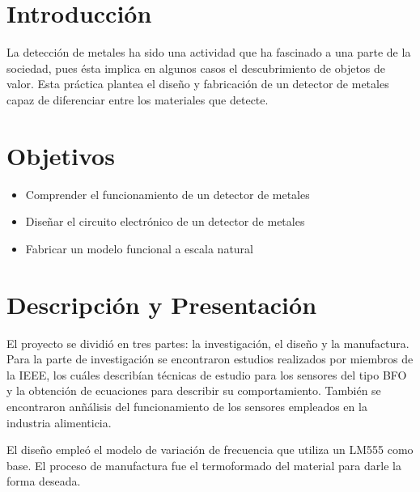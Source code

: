\section{Introducci\'on}
La detecci\'on de metales ha sido una actividad que ha fascinado a una parte de la 
sociedad, pues \'esta implica en  algunos casos el descubrimiento de objetos de 
valor. Esta pr\'actica plantea el dise\~no y fabricaci\'on de un detector de metales
capaz de diferenciar entre los materiales que detecte.
\section{Objetivos}
\begin{itemize}
 \item Comprender el funcionamiento de un detector de metales
 \item Dise\~nar el circuito electr\'onico de un detector de metales
 \item Fabricar un modelo funcional a escala natural
\end{itemize}

\section{Descripci\'on y Presentaci\'on}
El proyecto se dividi\'o en tres partes: la investigaci\'on, el dise\~no 
y la manufactura. Para la parte de investigaci\'on se encontraron estudios
realizados por miembros de la IEEE, los cu\'ales describ\'ian t\'ecnicas de estudio
para los sensores del tipo BFO y la obtenci\'on de ecuaciones para describir su
comportamiento. Tambi\'en se encontraron an\~n\'alisis del funcionamiento de 
los sensores empleados en la industria alimenticia.

El dise\~no emple\'o el modelo de variaci\'on de frecuencia que utiliza un LM555 
como base. El proceso de manufactura fue el termoformado del material para 
darle la forma deseada.
